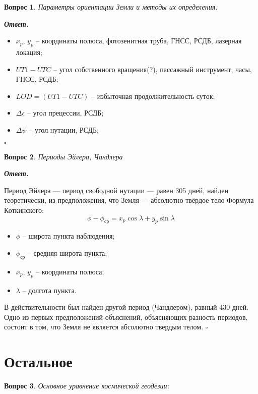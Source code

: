 \documentclass[12pt]{article}
\newtheorem{problem}{Вопрос}
\newenvironment{solution}[1][\it{Ответ}]{\textbf{#1. } }{$\square$}
\begin{document}
		
		\begin{problem}
			Параметры ориентации Земли и методы их определения:
		\end{problem}
		
		\begin{solution}
			\begin{itemize}
				\item $x_p$, $y_p$ -- координаты полюса, фотозенитная труба, ГНСС, РСДБ, лазерная локация;
				\item $UT1-UTC$ -- угол собственного вращения(?), пассажный инструмент, часы, ГНСС,
				РСДБ;
				\item $LOD = (UT1 - UTC)$ -- избыточная продолжительность суток;
				\item $\Delta\epsilon$ -- угол прецессии, РСДБ;
				\item $\Delta\psi$ -- угол нутации, РСДБ;
			\end{itemize}
		\end{solution}
		\begin{problem}
			Периоды Эйлера, Чандлера
		\end{problem}
		
		\begin{solution}
			
			Период Эйлера — период свободной нутации — равен 305 дней, найден теоретически, из
			предположения, что Земля — абсолютно твёрдое тело Формула Коткинского:
			$$\phi - \phi_{ср}=x_p \cos\lambda + y_p\sin\lambda$$
			\begin{itemize}
				\item $\phi$ -- широта пункта наблюдения;
				\item $\phi_{ср}$ -- средняя широта пункта;
				\item $x_p$, $y_p$ -- координаты полюса;
				\item $\lambda$ -- долгота пункта.
			\end{itemize}
			
			В действительности был найден другой период (Чандлером), равный 430 дней. Одно из
			первых предположений-объяснений, объясняющих разность периодов, состоит в том, что
			Земля не является абсолютно твердым телом.
		\end{solution}
		
\section{Остальное}
		\begin{problem}
			Основное уравнение космической геодезии:
		\end{problem}
		
\end{document}
